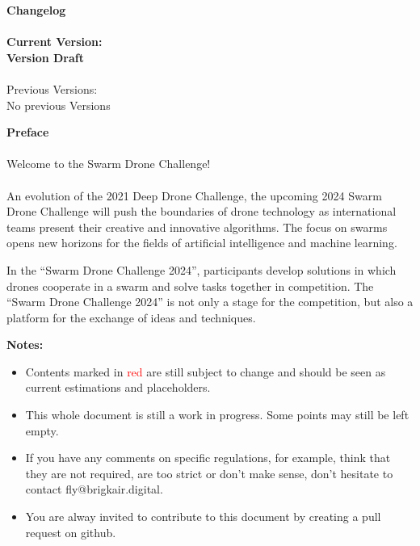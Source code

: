 
\newpage
{\bf Changelog}
\\ \\{\bf Current Version: \\Version Draft \getVersion{}}
\\ \\Previous Versions: \\ No previous Versions

\newpage
{\bf Preface}
\\ \\ Welcome to the Swarm Drone Challenge! \\ \\
An evolution of the 2021 Deep Drone Challenge, the upcoming 2024 Swarm Drone Challenge will push the boundaries of drone technology as international teams present their creative and innovative algorithms. The focus on swarms opens new horizons for the fields of artificial intelligence and machine learning.

In the “Swarm Drone Challenge 2024”, participants develop solutions in which drones cooperate in a swarm and solve tasks together in competition. The “Swarm Drone Challenge 2024” is not only a stage for the competition, but also a platform for the exchange of ideas and techniques.
\newpage


{\bf Notes:
	\begin{itemize}
		\item Contents marked in \textcolor{red}{red} are still subject to change and should be seen as current estimations and placeholders.
		\item This whole document is still a work in progress. Some points may still be left empty.
		\item If you have any comments on specific regulations, for example, think that they are not required, are too strict or don't make sense, don't hesitate to contact fly@brigkair.digital.
		\item You are alway invited to contribute to this document by creating a pull request on github.
	\end{itemize}
}
\hspace{10mm}

\newpage
\newpage



